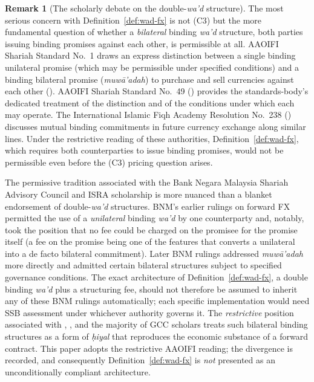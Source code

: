 \documentclass[preprint,12pt,authoryear]{elsarticle}
\theoremstyle{definition}
\newtheorem{remark}{Remark}[section]
\begin{document}
\begin{remark}[The scholarly debate on the double-\emph{wa'd}
    structure]
\label{rem:wad-debate}
The most serious concern with Definition~\ref{def:wad-fx} is
not (C3) but the more fundamental question of whether a
\emph{bilateral} binding \emph{wa'd} structure, both parties
issuing binding promises against each other, is permissible
at all. AAOIFI Shariah Standard No.~1 draws an express
distinction between a single binding unilateral promise (which
may be permissible under specified conditions) and a binding
bilateral promise (\emph{muw\={a}'adah}) to purchase and sell
currencies against each other (\citealp{AAOIFI2015}). AAOIFI
Shariah Standard No.~49 (\citealp{AAOIFI-SS49}) provides the
standards-body's dedicated treatment of the distinction and of
the conditions under which each may operate. The International
Islamic Fiqh Academy Resolution No.~238
(\citealp{OICFiqh238}) discusses mutual binding commitments in
future currency exchange along similar lines. Under the restrictive reading of these
authorities, Definition~\ref{def:wad-fx}, which requires both
counterparties to issue binding promises, would not be
permissible even before the (C3) pricing question arises.

The permissive tradition associated with the Bank Negara Malaysia
Shariah Advisory Council and ISRA scholarship is more nuanced
than a blanket endorsement of double-\emph{wa'd} structures.
BNM's earlier rulings on forward FX permitted the use of a
\emph{unilateral} binding \emph{wa'd} by one counterparty and,
notably, took the position that no fee could be charged on the
promisee for the promise itself (a fee on the promise being one
of the features that converts a unilateral into a de facto
bilateral commitment). Later BNM rulings addressed
\emph{muw\={a}'adah} more directly and admitted certain bilateral
structures subject to specified governance conditions. The exact
architecture of Definition~\ref{def:wad-fx}, a double binding
\emph{wa'd} plus a structuring fee, should not therefore be
assumed to inherit any of these BNM rulings automatically; each
specific implementation would need SSB assessment under whichever
authority governs it. The \emph{restrictive} position associated
with \citet{Usmani2002}, \citet{ElGamal2006}, and the majority of
GCC scholars treats such bilateral binding structures as a form
of \emph{\d{h}iyal} that reproduces the economic substance of a
forward contract. This paper adopts the restrictive AAOIFI
reading; the divergence is recorded, and consequently
Definition~\ref{def:wad-fx} is \emph{not} presented as an
unconditionally compliant architecture.


\end{remark}
\end{document}
